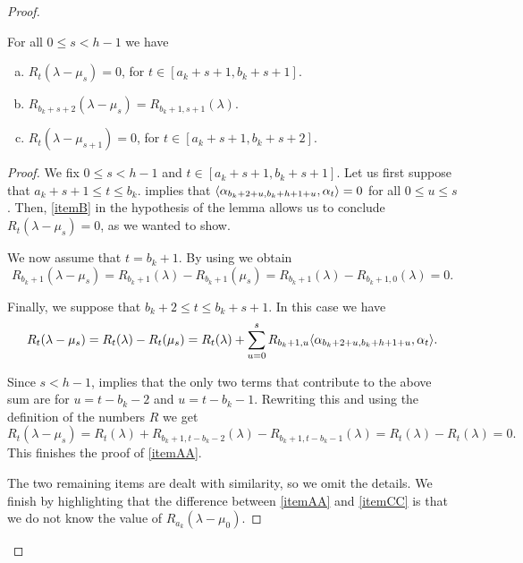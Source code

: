 \begin{proof}
\begin{claim}\label{claim: third string lemma 3}
For all $0\leq s < h-1$ we have
\begin{enumerate}[(a)]
    \item \label{itemAA} $R_t(\lambda - \mu_s) = 0$, for $t\in [a_{k}+s+1,b_{k}+s+1]$.
     \item \label{itemBB} $ R_{b_{k}+s+2} (\lambda -\mu_s) =  R_{b_{k}+1,s+1}(\lambda)$.
    \item \label{itemCC} $ R_{t}(\lambda -\mu_{s+1}) = 0$, 
    for $t\in [a_{k}+s+1,b_{k}+s+2]$.
\end{enumerate}
\end{claim}


\begin{proof}
We fix $0\leq s < h-1$ and  $t\in [a_{k}+s+1,b_{k}+s+1]$. 
Let us first suppose that $a_{k}+s+1 \leq  t\leq b_k$. 
  implies that $\langle \alpha_{b_k+2+u,b_k+h+1+u} , \alpha_t \rangle =0$ for all $0\leq u \leq s$. 
Then,  \cref{itemB} in the hypothesis of the lemma allows us to conclude  $R_{t}(\lambda - \mu_s)=0$, as we wanted to show.

We now assume that $t=b_{k}+1$. 
By using  we obtain
\begin{equation}
 R_{b_{k}+1}(\lambda - \mu_{s}) =   R_{b_{k}+1}(\lambda)-  R_{b_{k}+1}( \mu_{s})=R_{b_{k}+1}(\lambda)-  R_{b_{k}+1,0}( \lambda) =0.
\end{equation}

Finally, we suppose that $b_{k}+2\leq  t \leq b_k+s+1 $. 
In this case we have 
\begin{equation}
  R_{t}(\lambda -\mu_s) =   
  R_{t}(\lambda) - R_{t}(\mu_{s}) =
  R_{t}(\lambda)+ \sum_{u=0}^s R_{b_k+1,u} \langle \alpha_{b_k+2+u,b_k+h+1+u} , \alpha_t \rangle.
\end{equation}

Since $s<h-1$,  implies that the only two terms that contribute to the above sum are for $u=t-b_k-2$ and $u=t-b_k-1$. 
Rewriting this  and using the definition of the numbers $R$ we get 
\begin{equation}
R_{t}(\lambda -\mu_s) =   
R_{t}(\lambda)+R_{b_k+1,t-b_k-2}(\lambda) -R_{b_k+1,t-b_k-1}(\lambda) = 
R_{t}(\lambda)- R_{t}(\lambda) =
0.
\end{equation}
This finishes the proof of \cref{itemAA}.


The two remaining items are dealt with similarity, so we omit the details. 
We finish by highlighting that the difference between \cref{itemAA} and \cref{itemCC} is that we do not know the value of $  R_{a_{k}}(\lambda -\mu_0)$.
\end{proof}




\end{proof}

